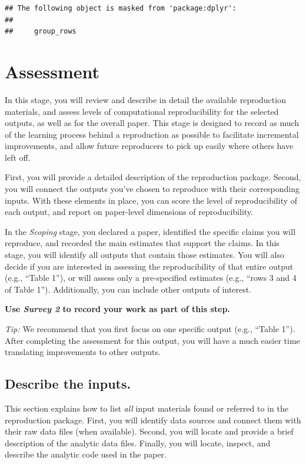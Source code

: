 \documentclass[]{book}
\begin{document}
\begin{verbatim}
## The following object is masked from 'package:dplyr':
## 
##     group_rows
\end{verbatim}

\hypertarget{assessment}{%
\chapter{Assessment}\label{assessment}}

In this stage, you will review and describe in detail the available reproduction materials, and assess levels of computational reproducibility for the selected outputs, as well as for the overall paper. This stage is designed to record as much of the learning process behind a reproduction as possible to facilitate incremental improvements, and allow future reproducers to pick up easily where others have left off.

First, you will provide a detailed description of the reproduction package. Second, you will connect the outputs you've chosen to reproduce with their corresponding inputs. With these elements in place, you can score the level of reproducibility of each output, and report on paper-level dimensions of reproducibility.

In the \emph{Scoping} stage, you declared a paper, identified the specific claims you will reproduce, and recorded the main estimates that support the claims. In this stage, you will identify all outputs that contain those estimates. You will also decide if you are interested in assessing the reproducibility of that entire output (e.g., ``Table 1''), or will assess only a pre-specified estimates (e.g., ``rows 3 and 4 of Table 1''). Additionally, you can include other outputs of interest.

\textbf{Use \emph{Survey 2} to record your work as part of this step.}

\emph{Tip:} We recommend that you first focus on one specific output (e.g., ``Table 1''). After completing the assessment for this output, you will have a much easier time translating improvements to other outputs.

\hypertarget{describe-inputs}{%
\section{Describe the inputs.}\label{describe-inputs}}

This section explains how to list \emph{all} input materials found or referred to in the reproduction package. First, you will identify data sources and connect them with their raw data files (when available). Second, you will locate and provide a brief description of the analytic data files. Finally, you will locate, inspect, and describe the analytic code used in the paper.
\end{document}
